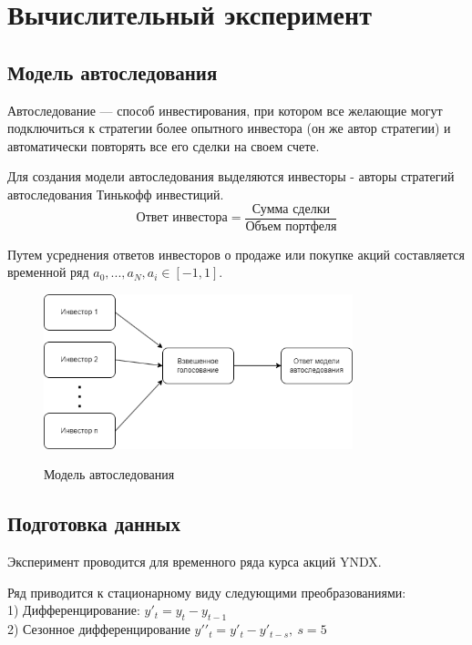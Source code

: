 \newpage

\section{Вычислительный эксперимент}

\subsection{Модель автоследования} 

Автоследование --- способ инвестирования, при котором все желающие могут подключиться к стратегии более опытного инвестора (он же автор стратегии) и автоматически повторять все его сделки на своем счете. 

Для создания модели автоследования выделяются инвесторы - авторы стратегий автоследования Тинькофф инвестиций. 
\[\text{Ответ инвестора} = \frac{\text{Сумма сделки}}{\text{Объем портфеля}}\]

Путем усреднения ответов инвесторов о продаже или покупке акций составляется временной ряд $a_{0}, ..., a_{N}, a_{i} \in [-1, 1]$.

\begin{figure}[h!t]\center
{\includegraphics[width=0.8\textwidth]{results/voting.png}}
\caption{Модель автоследования}
\end{figure}

\subsection{Подготовка данных} 
Эксперимент проводится для временного ряда курса акций YNDX. 

Ряд приводится к стационарному виду следующими преобразованиями: \\
1) Дифференцирование: $y'_{t} = y_{t} - y_{t-1}$ \\ 
2) Сезонное дифференцирование $y' '_{t} = y'_{t} - y'_{t-s}, \ s=5$ \\

